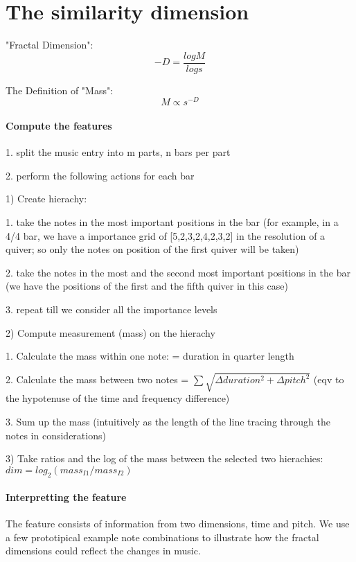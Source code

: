 \documentclass[acmsmall,review,anonymous]{acmart}\settopmatter{printfolios=true,printccs=false,printacmref=false}
\begin{document}
\section{The similarity dimension}
"Fractal Dimension": $$-D=\frac{logM}{logs}$$

 The Definition of "Mass": $$M\propto{s}^{-D}$$

 \paragraph{Compute the features}
 1. split the music entry into m parts, n bars per part
 
 2. perform the following actions for each bar
 
 1) Create hierachy:
 
      1. take the notes in the most important positions in the bar (for example,
      in a 4/4 bar, we have a importance grid of [5,2,3,2,4,2,3,2] in the
      resolution of a quiver; so only the notes on position of the first quiver
      will be taken)
      
      2. take the notes in the most and the second most important positions in
      the bar (we have the positions of the first and the fifth quiver in this
      case)
      
      3. repeat till we consider all the importance levels
      
 2) Compute measurement (mass) on the hierachy
      
      1. Calculate the mass within one note: = duration in quarter length
 
      2. Calculate the mass between two notes =  $\sum \sqrt{\Delta duration^2 +
        \Delta pitch^2}$ (eqv to the hypotenuse of the time and frequency
      difference)
      
      3. Sum up the mass (intuitively as the length of the line tracing through
      the notes in considerations)
      
   3) Take ratios and the log of the mass between the selected two hierachies: $dim = log_2(mass_{I1}/mass_{I2}) $

\paragraph{Interpretting the feature}
The feature consists of information from two dimensions, time and pitch. We use
a few prototipical example note combinations to illustrate how the fractal
dimensions could reflect the changes in music.
\end{document}
